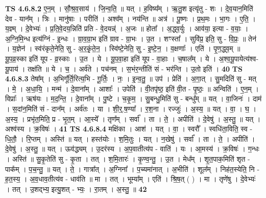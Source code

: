 \documentclass[17pt]{extarticle}
\begin{document}
                  \newline
                                \textbf{ TS 4.6.8.2} \newline
                  ए॒न॒म् । सौ॒श्र॒व॒साय॑ । जि॒न्व॒ति॒ ॥ यत् । ह॒विष्य᳚म् । ऋ॒तु॒श इत्यृ॑तु - शः । दे॒व॒यान॒मिति॑ देव - यान᳚म् । त्रिः । मानु॑षाः । परीति॑ । अश्व᳚म् । नय॑न्ति ॥ अत्र॑ । पू॒ष्णः । प्र॒थ॒मः । भा॒गः । ए॒ति॒ । य॒ज्ञ्म् । दे॒वेभ्यः॑ । प्र॒ति॒वे॒दय॒न्निति॑ प्रति - वे॒दयन्न्॑ । अ॒जः ॥ होता᳚ । अ॒द्ध्व॒र्युः । आव॑या॒ इत्या - व॒याः॒ । अ॒ग्नि॒मि॒न्ध इत्य॑ग्निं - इ॒न्धः । ग्रा॒व॒ग्रा॒भ इति॑ ग्राव - ग्रा॒भः । उ॒त । शꣳस्ता᳚ । सुवि॑प्र॒ इति॒ सु - वि॒प्रः॒ ॥ तेन॑ । य॒ज्ञेन॑ । स्व॑रंकृते॒नेति॒ सु - अ॒र॒कृं॒ते॒न॒ । स्वि॑ष्टे॒नेति॒ सु - इ॒ष्टे॒न॒ । व॒क्षणाः᳚ । एति॑ । पृ॒ण॒द्ध्व॒म् ॥ यू॒प॒व्र॒स्का इति॑ यूप - व्र॒स्काः । उ॒त । ये । यू॒प॒वा॒हा इति॑ यूप - वा॒हाः । च॒षाल᳚म् । ये । अ॒श्व॒यू॒पायेत्य॑श्व-यू॒पाय॑ । तक्ष॑ति ॥ ये । च॒ । अर्व॑ते । पच॑नम् । स॒भंर॒न्तीति॑ सं - भर॑न्ति । उ॒तो इति॑ । \textbf{  40} \newline
                  \newline
                                \textbf{ TS 4.6.8.3} \newline
                  तेषा᳚म् । अ॒भिगू᳚र्ति॒रित्य॒भि - गू॒र्तिः॒ । नः॒ । इ॒न्व॒तु॒ ॥ उप॑ । प्रेति॑ । अ॒गा॒त् । सु॒मदिति॑ सु - मत् । मे॒ । अ॒धा॒यि॒ । मन्म॑ । दे॒वाना᳚म् । आशाः᳚ । उपेति॑ । वी॒तपृ॑ष्ठ॒ इति॑ वी॒त - पृ॒ष्ठः॒ ॥ अन्विति॑ । ए॒न॒म् । विप्राः᳚ । ऋष॑यः । म॒द॒न्ति॒ । दे॒वाना᳚म् । पु॒ष्टे । च॒कृ॒म॒ । सु॒बन्धु॒मिति॑ सु - बन्धु᳚म् ॥ यत् । वा॒जिनः॑ । दाम॑ । स॒दांन॒मिति॑ सं - दान᳚म् । अर्व॑तः । या । शी॒र्॒.ष॒ण्या᳚ । र॒श॒ना । रज्जुः॑ । अ॒स्य॒ ॥ यत् । वा॒ । घ॒ । अ॒स्य॒ । प्रभृ॑त॒मिति॒ प्र - भृ॒त॒म् । आ॒स्ये᳚ । तृण᳚म् । सर्वा᳚ । ता । ते॒ । अपीति॑ । दे॒वेषु॑ । अ॒स्तु॒ ॥ यत् । अश्व॑स्य । क्र॒विषः॑ । \textbf{  41} \newline
                  \newline
                                \textbf{ TS 4.6.8.4} \newline
                  मक्षि॑का । आश॑ । यत् । वा॒ । स्वरौ᳚ । स्वधि॑ता॒विति॒ स्व - धि॒तौ॒ । रि॒प्तम् । अस्ति॑ ॥ यत् । हस्त॑योः । श॒मि॒तुः । यत् । न॒खेषु॑ । सर्वा᳚ । ता । ते॒ । अपीति॑ । दे॒वेषु॑ । अ॒स्तु॒ ॥ यत् । ऊव॑द्ध्यम् । उ॒दर॑स्य । अ॒प॒वातीत्य॑प - वाति॑ । यः । आ॒मस्य॑ । क्र॒विषः॑ । ग॒न्धः । अस्ति॑ ॥ सु॒कृ॒तेति॑ सु - कृ॒ता । तत् । श॒मि॒तारः॑ । कृ॒ण्व॒न्तु॒ । उ॒त । मेध᳚म् । शृ॒त॒पाक॒मिति॑ शृत - पाक᳚म् । प॒च॒न्तु॒ ॥ यत् । ते॒ । गात्रा᳚त् । अ॒ग्निना᳚ । प॒च्यमा॑नात् । अ॒भीति॑ । शूल᳚म् । निह॑त॒स्येति॒ नि - ह॒त॒स्य॒ । अ॒व॒धाव॒तीत्य॑व - धाव॑ति ॥ मा । तत् । भूम्या᳚म् । एति॑ । श्रि॒ष॒त् ( ) । मा । तृणे॑षु । दे॒वेभ्यः॑ । तत् । उ॒शद्भ्य॒ इत्यु॒शत् - भ्यः॒ । रा॒तम् । अ॒स्तु॒ ॥ \textbf{  42 } \newline
\end{document}
